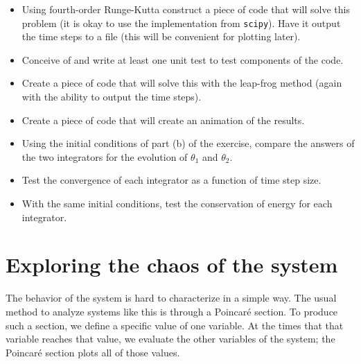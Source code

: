 \documentclass[11pt, preprint]{aastex}
\begin{document}
\begin{itemize}
\item Using fourth-order Runge-Kutta construct a piece of code that
  will solve this problem (it is okay to use the implementation from
  {\tt scipy}). Have it output the time steps to a file (this will be
  convenient for plotting later).
\item Conceive of and write at least one unit test to test components
  of the code.
\item Create a piece of code that will solve this with the leap-frog
  method (again with the ability to output the time steps).
\item Create a piece of code that will create an animation of the
  results.
\item Using the initial conditions of part (b) of the exercise,
  compare the answers of the two integrators for the evolution of
  $\theta_1$ and $\theta_2$.
\item Test the convergence of each integrator as a function of time
  step size.
\item With the same initial conditions, test the conservation of
  energy for each integrator.
\end{itemize}

\section{Exploring the chaos of the system}

The behavior of the system is hard to characterize in a simple
way. The usual method to analyze systems like this is through a
Poincar{\'e} section. To produce such a section, we define a specific
value of one variable. At the times that that variable reaches that
value, we evaluate the other variables of the system; the Poincar{\'e}
section plots all of those values.
\end{document}
